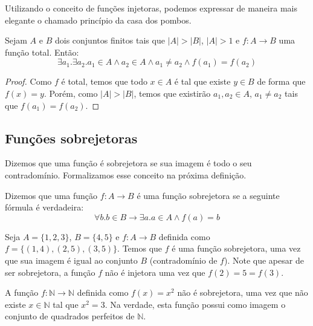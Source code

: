 Utilizando o conceito de funções injetoras, podemos expressar de
maneira mais elegante o chamado princípio da casa dos pombos.

\begin{Theorem}
Sejam $A$ e $B$ dois conjuntos finitos tais que $|A| > |B|$, $|A| >
1$ e $f : A \to B$ uma função total. Então:
\[
\exists a_1. \exists a_2. a_1 \in A \land a_2 \in A \land a_1 \neq a_2
\land f(a_1) = f(a_2)
\]
\end{Theorem}
\begin{proof}
Como $f$ é total, temos que todo $x\in A$ é tal que existe $y \in B$
de forma que $f(x) = y$. Porém, como $|A| > |B|$, temos que existirão
$a_1, a_2 \in A$, $a_1 \neq a_2$ tais que $f(a_1) = f(a_2)$.
\end{proof}



\subsection{Funções sobrejetoras}

Dizemos que uma função é sobrejetora se sua imagem é todo o seu
contradomínio. Formalizamos esse conceito na próxima definição.

\begin{Definition}
Dizemos que uma função $f : A \to B$ é uma função sobrejetora se a
seguinte fórmula é verdadeira:
\[
\forall b. b\in B \to \exists a. a \in A \land f(a) = b
\]
\end{Definition}

\begin{Example}
Seja $A =\{1,2,3\}$, $B =\{4,5\}$ e  $f : A \to B$ definida como $f
=\{(1,4),(2,5),(3,5)\}$. Temos que $f$ é uma função sobrejetora, uma
vez que sua imagem é igual ao conjunto $B$ (contradomínio de
$f$). Note que apesar de ser sobrejetora, a função $f$ não é
injetora uma vez que $f(2) = 5 = f(3)$.
\end{Example}

\begin{Example}
A função $f : \mathbb{N} \to \mathbb{N}$ definida como $f(x) = x^2$
não é sobrejetora, uma vez que não existe $x \in \mathbb{N}$ tal que
$x^2 = 3$. Na verdade, esta função possui como imagem o conjunto de
quadrados perfeitos de $\mathbb{N}$.
\end{Example}

